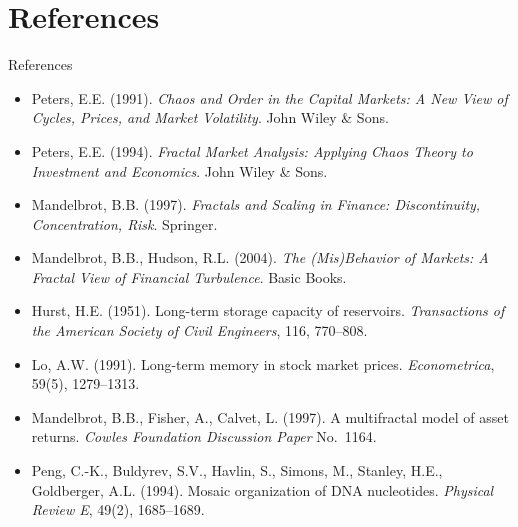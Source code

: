 \documentclass[9pt, aspectratio=169, t]{beamer}
\theoremstyle{definition}
\begin{document}
\section{References}

\begin{frame}{References}
    \begin{itemize}
        \item Peters, E.E. (1991). \textit{Chaos and Order in the Capital Markets: A New View of Cycles, Prices, and Market Volatility}. John Wiley \& Sons.
        \item Peters, E.E. (1994). \textit{Fractal Market Analysis: Applying Chaos Theory to Investment and Economics}. John Wiley \& Sons.
        \item Mandelbrot, B.B. (1997). \textit{Fractals and Scaling in Finance: Discontinuity, Concentration, Risk}. Springer.
        \item Mandelbrot, B.B., Hudson, R.L. (2004). \textit{The (Mis)Behavior of Markets: A Fractal View of Financial Turbulence}. Basic Books.
        \item Hurst, H.E. (1951). Long-term storage capacity of reservoirs. \textit{Transactions of the American Society of Civil Engineers}, 116, 770--808.
        \item Lo, A.W. (1991). Long-term memory in stock market prices. \textit{Econometrica}, 59(5), 1279--1313.
        \item Mandelbrot, B.B., Fisher, A., Calvet, L. (1997). A multifractal model of asset returns. \textit{Cowles Foundation Discussion Paper} No.~1164.
        \item Peng, C.-K., Buldyrev, S.V., Havlin, S., Simons, M., Stanley, H.E., Goldberger, A.L. (1994). Mosaic organization of DNA nucleotides. \textit{Physical Review E}, 49(2), 1685--1689.
    \end{itemize}
\end{frame}
\end{document}
